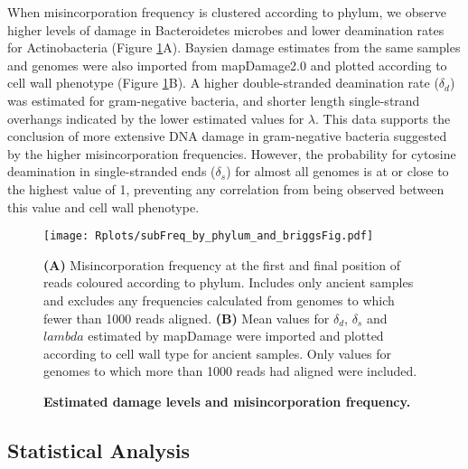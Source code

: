 \documentclass[12pt, a4paper]{article}
\begin{document}
When misincorporation frequency is clustered according to phylum, we observe higher levels of damage in Bacteroidetes microbes and lower deamination rates for Actinobacteria (Figure \ref{fig:misincoprPhylumFig}A).
Baysien damage estimates from the same samples and genomes were also imported from mapDamage2.0 and plotted according to cell wall phenotype (Figure \ref{fig:misincoprPhylumFig}B). 
A higher double-stranded deamination rate ($\delta_d$) was estimated for gram-negative bacteria, and shorter length single-strand overhangs indicated by the lower estimated values for $\lambda$.
This data supports the conclusion of more extensive DNA damage in gram-negative bacteria suggested by the higher misincorporation frequencies.
However, the probability for cytosine deamination in single-stranded ends ($\delta_s$) for almost all genomes is at or close to the highest value of 1, preventing any correlation from being observed between this value and cell wall phenotype.

\begin{figure}[ht!]
	\setlength{\abovecaptionskip}{6pt}
	\begin{center}
	\texttt{[image: Rplots/subFreq\_by\_phylum\_and\_briggsFig.pdf]}
	\end{center}
	\caption[Estimated damage levels and misincorporation frequency.]{\textbf{Estimated damage levels and misincorporation frequency.}}\small{\textbf{(A)} Misincorporation frequency at the first and final position of reads coloured according to phylum. Includes only ancient samples and excludes any frequencies calculated from genomes to which fewer than 1000 reads aligned. \textbf{(B)} Mean values for $\delta_d$, $\delta_s$ and $lambda$ estimated by mapDamage were imported and plotted according to cell wall type for ancient samples. Only values for genomes to which more than 1000 reads had aligned were included.}\label{fig:misincoprPhylumFig}
\end{figure}
\clearpage

\subsection{Statistical Analysis}
\end{document}
